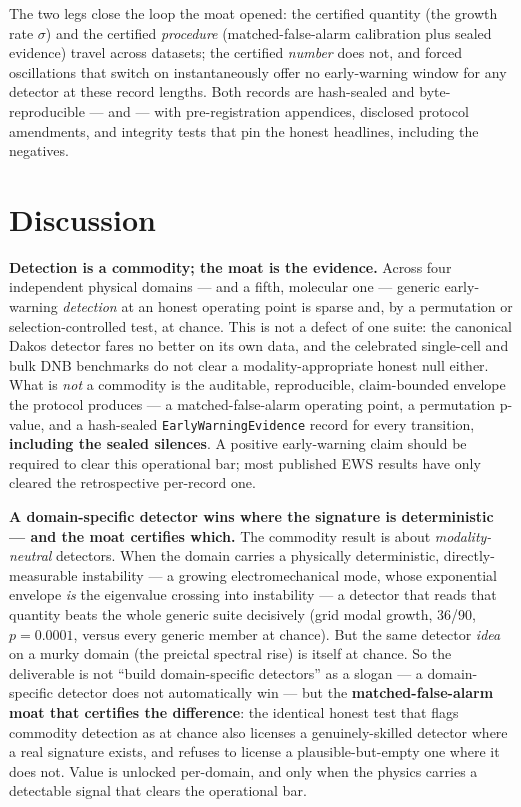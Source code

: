\documentclass[11pt]{article}
\newcommand{\code}[1]{\texttt{#1}}
\begin{document}
The two legs close the loop the moat opened: the certified quantity (the
growth rate $\sigma$) and the certified \emph{procedure}
(matched-false-alarm calibration plus sealed evidence) travel across
datasets; the certified \emph{number} does not, and forced oscillations
that switch on instantaneously offer no early-warning window for any
detector at these record lengths. Both records are hash-sealed and
byte-reproducible ---
 and
 --- with pre-registration
appendices, disclosed protocol amendments, and integrity tests that pin
the honest headlines, including the negatives.

\section{Discussion}\label{sec:discussion}

\textbf{Detection is a commodity; the moat is the evidence.} Across four
independent physical domains --- and a fifth, molecular one --- generic
early-warning \emph{detection} at an honest operating point is sparse
and, by a permutation or selection-controlled test, at chance. This is
not a defect of one suite: the canonical Dakos detector fares no better
on its own data, and the celebrated single-cell and bulk DNB benchmarks
do not clear a modality-appropriate honest null either. What is
\emph{not} a commodity is the auditable, reproducible, claim-bounded
envelope the protocol produces --- a matched-false-alarm operating
point, a permutation p-value, and a hash-sealed
\code{EarlyWarningEvidence} record for every transition,
\textbf{including the sealed silences}. A positive early-warning claim
should be required to clear this operational bar; most published EWS
results have only cleared the retrospective per-record one.

\textbf{A domain-specific detector wins where the signature is
deterministic --- and the moat certifies which.} The commodity result is
about \emph{modality-neutral} detectors. When the domain carries a
physically deterministic, directly-measurable instability --- a growing
electromechanical mode, whose exponential envelope \emph{is} the
eigenvalue crossing into instability --- a detector that reads that
quantity beats the whole generic suite decisively (grid modal growth,
36/90, $p = 0.0001$, versus every generic member at chance). But the
same detector \emph{idea} on a murky domain (the preictal spectral rise)
is itself at chance. So the deliverable is not ``build domain-specific
detectors'' as a slogan --- a domain-specific detector does not
automatically win --- but the \textbf{matched-false-alarm moat that
certifies the difference}: the identical honest test that flags
commodity detection as at chance also licenses a genuinely-skilled
detector where a real signature exists, and refuses to license a
plausible-but-empty one where it does not. Value is unlocked per-domain,
and only when the physics carries a detectable signal that clears the
operational bar.
\end{document}
